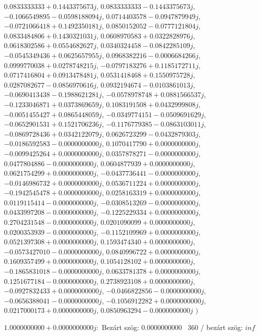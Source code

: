 \documentclass[14pt,a4paper]{article}
\begin{document}
\begin{itemize}
$0.0833333333+0.1443375673j$, $0.0833333333-0.1443375673j$, $-0.1066549895-0.0598188094j$, $0.0714403578-0.0947879949j$, $-0.0721066418+0.1492350181j$, $0.0850152052-0.0777121804j$, $0.0833484806+0.1430321031j$, $0.0608970583+0.0322828976j$, $0.0618302586+0.0554682627j$, $0.0340324458-0.0842285109j$, $-0.0545349436+0.0625657955j$, $0.0968382216-0.0006684266j$, $0.0999770038+0.0278748215j$, $-0.0797183276+0.1185172711j$, $0.0717416804+0.0913478481j$, $0.0531418468+0.1550975728j$, $0.0287082677-0.0856970616j$, $0.0932194674-0.0103861013j$, $-0.0690413438-0.1988621281j$, $-0.0578978748+0.0881566537j$, $-0.1233046871+0.0373869659j$, $0.1083191508+0.0432999808j$, $-0.0051455427+0.0865448059j$, $-0.0349774151-0.0509691629j$, $-0.0652901531+0.1521706236j$, $-0.1176779385-0.0863103011j$, $-0.0869728436+0.0342122079j$, $0.0626723299-0.0432879303j$, $-0.0186592583-0.0000000000j$, $0.1070417790+0.0000000000j$, $-0.0099425264+0.0000000000j$, $0.0357878271-0.0000000000j$, $0.0477804886-0.0000000000j$, $0.0604877939+0.0000000000j$, $0.0621754299+0.0000000000j$, $-0.0437736441-0.0000000000j$, $-0.0146986732+0.0000000000j$, $0.0536711224+0.0000000000j$, $-0.1942545478+0.0000000000j$, $0.0258163319+0.0000000000j$, $0.0119115414-0.0000000000j$, $-0.0308513269-0.0000000000j$, $0.0433997208-0.0000000000j$, $-0.1225229334+0.0000000000j$, $0.2704231548-0.0000000000j$, $0.0201090099+0.0000000000j$, $0.0200353939-0.0000000000j$, $-0.1152109969+0.0000000000j$, $0.0521397308+0.0000000000j$, $0.1593474340+0.0000000000j$, $-0.0573427010-0.0000000000j$, $0.0840996722+0.0000000000j$, $0.1609357499+0.0000000000j$, $0.1054128102+0.0000000000j$, $-0.1865831018-0.0000000000j$, $0.0633781378+0.0000000000j$, $0.1251677184-0.0000000000j$, $0.2738923108+0.0000000000j$, $-0.0927832433+0.0000000000j$, $-0.0466822856-0.0000000000j$, $-0.0656388041-0.0000000000j$, $-0.1056912282+0.0000000000j$, $0.0217000173+0.0000000000j$, $0.0850963294-0.0000000000j$
$\big)$
\end{itemize}
$1.0000000000+0.0000000000j$:\
Bezárt szög: $0.0000000000$ \
360 / bezárt szög: $inf$\
\end{document}
